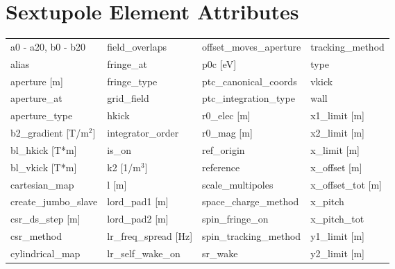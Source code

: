  \section{Sextupole Element Attributes}
 \label{s:list.sextupole}
 
 \begin{tabular}{llll} \toprule
a0 - a20, b0 - b20               & field_overlaps                   & offset_moves_aperture            & tracking_method                  \\
alias                            & fringe_at                        & p0c [eV]                         & type                             \\
aperture [m]                     & fringe_type                      & ptc_canonical_coords             & vkick                            \\
aperture_at                      & grid_field                       & ptc_integration_type             & wall                             \\
aperture_type                    & hkick                            & r0_elec [m]                      & x1_limit [m]                     \\
b2_gradient [T/m$^2$]            & integrator_order                 & r0_mag [m]                       & x2_limit [m]                     \\
bl_hkick [T*m]                   & is_on                            & ref_origin                       & x_limit [m]                      \\
bl_vkick [T*m]                   & k2 [1/m$^3$]                     & reference                        & x_offset [m]                     \\
cartesian_map                    & l [m]                            & scale_multipoles                 & x_offset_tot [m]                 \\
create_jumbo_slave               & lord_pad1 [m]                    & space_charge_method              & x_pitch                          \\
csr_ds_step [m]                  & lord_pad2 [m]                    & spin_fringe_on                   & x_pitch_tot                      \\
csr_method                       & lr_freq_spread [Hz]              & spin_tracking_method             & y1_limit [m]                     \\
cylindrical_map                  & lr_self_wake_on                  & sr_wake                          & y2_limit [m]                     \\

\end{tabular}
